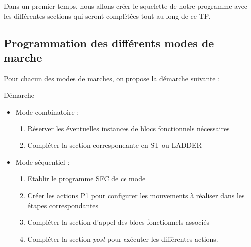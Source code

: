\begin{UPSTIManipulation}
    Dans un premier temps, nous allons créer le squelette de notre programme avec les différentes sections qui seront complétées tout au long de ce TP.
\end{UPSTIManipulation}

\begin{UPSTIManipulation}
\end{UPSTIManipulation}

\subsection{Programmation des différents modes de marche}
Pour chacun des modes de marches, on propose la démarche suivante :

\begin{UPSTIinfor}{Démarche}
    \begin{itemize}
        \item Mode combinatoire :
              \begin{enumerate}
                  \item Réserver les éventuelles instances de blocs fonctionnels nécessaires
                  \item Compléter la section correspondante en ST ou LADDER
              \end{enumerate}
        \item Mode séquentiel :
                \begin{enumerate}
                    \item Etablir le programme SFC de ce mode 
                    \item Créer les actions P1 pour configurer les mouvements à réaliser dans les étapes correspondantes
                    \item Compléter la section d'appel des blocs fonctionnels associés 
                    \item Compléter la section \textit{post} pour exécuter les différentes actions. 
                \end{enumerate}
    \end{itemize}
\end{UPSTIinfor}

